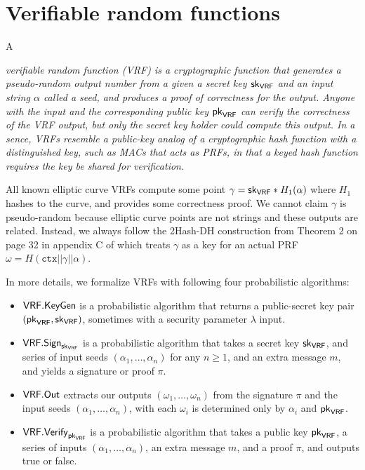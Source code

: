 \section{Verifiable random functions}
\label{sec:VRFs}


A {\em verifiable random function (VRF) is a cryptographic function that generates a pseudo-random output number from a given a secret key $\mathsf{sk}_{\mathsf{VRF}}$ and an input string $\alpha$ called a seed, and produces a proof of correctness for the output.  Anyone with the input and the corresponding public key $\mathsf{pk}_{\mathsf{VRF}}$ can verify the correctness of the VRF output, but only the secret key holder could compute this output.  In a sence, VRFs resemble a public-key analog of a cryptographic hash function with a distinguished key, such as MACs that acts as PRFs, in that a keyed hash function requires the key be shared for verification. 

All known elliptic curve VRFs compute some point $\gamma = \mathsf{sk}_{\mathsf{VRF}} * H_1(\alpha)$ where $H_1$ hashes to the curve, and provides some correctness proof.  We cannot claim $\gamma$ is pseudo-random because elliptic curve points are not strings and these outputs are related.  Instead, we always follow the 2Hash-DH construction from Theorem 2 on page 32 in appendix C of \cite{Praos} which treats $\gamma$ as a key for an actual PRF $\omega = H(\mathtt{ctx} || \gamma || \alpha)$.  

In more details, we formalize VRFs with following four probabilistic algorithms: 
\begin{itemize}
\item $\mathsf{VRF}.\mathsf{KeyGen}$ is a probabilistic algorithm that returns a public-secret key pair $(\mathsf{pk}_{\mathsf{VRF}},\mathsf{sk}_{\mathsf{VRF}})$, sometimes with a security parameter $\lambda$ input.
\item $\mathsf{VRF}.\mathsf{Sign}_{\mathsf{sk}_{\mathsf{VRF}}}$ is a probabilistic algorithm that takes a secret key $\mathsf{sk}_{\mathsf{VRF}}$, and series of input seeds $(\alpha_1,\ldots,\alpha_n)$ for any $n\ge1$, and an extra message $m$, and yields a signature or proof $\pi$. 
\item $\mathsf{VRF}.\mathsf{Out}$ extracts our outputs $(\omega_1,\ldots,\omega_n)$ from the signature $\pi$ and the input seeds $(\alpha_1,\ldots,\alpha_n)$, with each $\omega_i$ is determined only by $\alpha_i$ and $\mathsf{pk}_{\mathsf{VRF}}$.
\item $\mathsf{VRF}.\mathsf{Verify}_{\mathsf{pk}_{\mathsf{VRF}}}$ is a probabilistic algorithm that takes a public key $\mathsf{pk}_{\mathsf{VRF}}$, a series of inputs $(\alpha_1,\ldots,\alpha_n)$, an extra message $m$, and a proof $\pi$, and outputs true or false.
\end{itemize}

}
